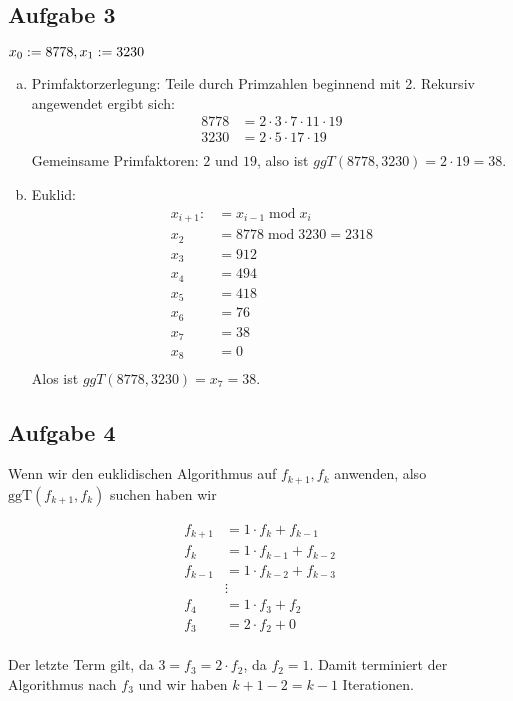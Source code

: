 \subsection*{Aufgabe 3}
$x_0 := 8778, x_1 := 3230 \\$
\begin{enumerate}[a)]
  \item Primfaktorzerlegung:
  Teile durch Primzahlen beginnend mit 2. Rekursiv angewendet ergibt sich:
\begin{align*}
8778 &= 2 \cdot 3 \cdot 7 \cdot 11 \cdot 19 \\
3230 &= 2 \cdot 5 \cdot 17 \cdot 19 \\
\end{align*}
Gemeinsame Primfaktoren: $2$ und $19$, also ist $ggT(8778, 3230) = 2 \cdot 19 = 38$.
  \item Euklid:
\begin{align*}
x_{i+1} :&= x_{i-1} \; \text{mod} \; x_i \\
x_2 &= 8778 \; \text{mod} \; 3230 = 2318 \\
x_3 &= 912 \\
x_4 &= 494 \\
x_5 &= 418 \\
x_6 &= 76 \\
x_7 &= 38 \\
x_8 &= 0 \\
\end{align*}
Alos ist $ggT(8778, 3230) = x_7 = 38$.
\end{enumerate}

\subsection*{Aufgabe 4}

Wenn wir den euklidischen Algorithmus auf $f_{k+1}, f_k$ anwenden, also $\text{ggT}(f_{k+1}, f_k)$ suchen haben wir

\begin{align*}
f_{k+1} &= 1 \cdot f_k + f_{k-1} \\
f_{k}   &= 1 \cdot f_{k-1} + f_{k-2} \\
f_{k-1} &= 1 \cdot f_{k-2} + f_{k-3} \\
        &\vdots \\
f_4 &= 1 \cdot f_3 + f_2 \\
f_3 &= 2 \cdot f_2 + 0 \\
\end{align*}

Der letzte Term gilt, da $3 = f_3 = 2 \cdot f_2$, da $f_2 = 1$. Damit terminiert der Algorithmus nach $f_3$ und wir haben $k+1-2 = k-1$ Iterationen.\\

